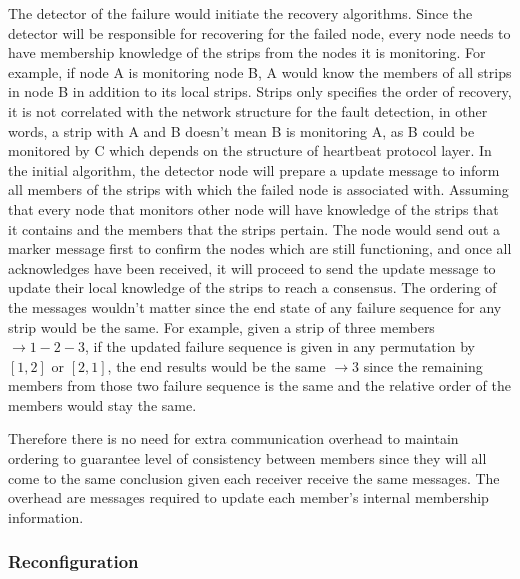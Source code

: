 The detector of the failure would initiate the recovery algorithms.
Since the detector will be responsible for recovering for the failed node,
every node needs to have membership knowledge of the strips from the nodes it
is monitoring. For example, if node A is monitoring node B, A would know the
members of all strips in node B in addition to its local strips. Strips only
specifies the order of recovery, it is not correlated with the network
structure for the fault detection, in other words, a strip with A and B doesn't
mean B is monitoring A, as B could be monitored by C which depends on the
structure of heartbeat protocol layer.
In the initial algorithm, the detector node will prepare a update message to
inform all members of the strips with which the failed node is associated with.
Assuming that every node that monitors other node will have knowledge of the
strips that it contains and the members that the strips pertain. The node would
send out a marker message first to confirm the nodes which are still
functioning, and once all acknowledges have been received, it will proceed to
send the update message to update their local knowledge of the strips to reach
a consensus. The ordering of the messages wouldn't matter since the end state
of any failure sequence for any strip would be the same. For example, given
a strip of three members $\rightarrow 1-2-3$, if the updated failure sequence
is given in any permutation by $[1, 2]$ or $[2, 1]$, the end results would be
the same $\rightarrow 3$ since the remaining members from those two failure
sequence is the same and the relative order of the members would stay the same.

Therefore there is no need for extra communication overhead to maintain
ordering to guarantee level of consistency between members since they will all
come to the same conclusion given each receiver receive the same messages. The
overhead are messages required to update each member's internal membership
information.


\subsubsection{Reconfiguration}
\label{s:reconfig}

